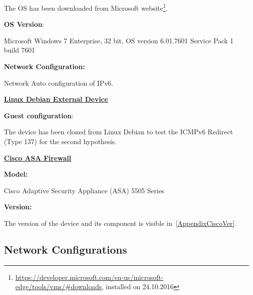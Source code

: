 \documentclass[12pt]{article}
\begin{document}
The OS has been downloaded from Microsoft website\footnote{\url{https://developer.microsoft.com/en-us/microsoft-edge/tools/vms/\#downloads}, installed on 24.10.2016}.

\textbf{OS Version}:

\vspace{-10pt}
Microsoft Windows 7 Enterprise, 32 bit, OS version 6.01.7601 Service Pack 1 build 7601

\textbf{Network Configuration:}

\vspace{-10pt}
Network Auto configuration of IPv6.

\textbf{\underline{Linux Debian External Device}}

\vspace{-10pt}
\textbf{Guest configuration}:

\begin{savenotes}
\begin{table}[!htpb]
\centering
\addtolength{\tabcolsep}{1pt}
\noindent{}
\caption{Linux Debian External}
\label{table:linuxDebExt}
\end{table}
\end{savenotes}

The device has been cloned from Linux Debian to test the ICMPv6 Redirect (Type 137) for the second hypothesis.

\textbf{\underline{Cisco ASA Firewall}}

\vspace{-10pt}
\textbf{Model:} 

\vspace{-15pt}
Cisco Adaptive Security Appliance (ASA) 5505 Series

\textbf{Version:}

\vspace{-10pt}
The version of the device and its component is visible in~\cref{AppendixCiscoVer}.


\subsection{Network Configurations}
\label{subsection:netConfigurations}
\end{document}
